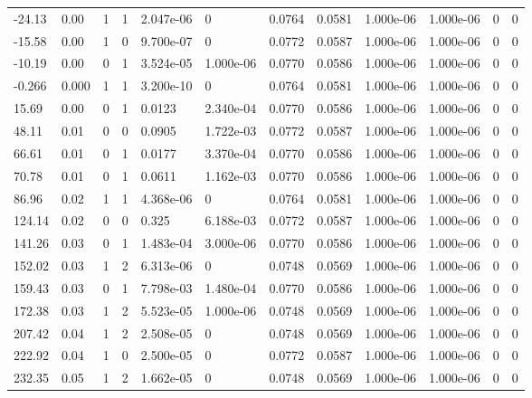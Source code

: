 \documentclass[preview]{standalone}
\begin{document}
{{\begin{tabular}{L{1.2cm}C{1.2cm} C{0.3cm}C{0.5cm} C{1.4cm}C{1.4cm} C{1.4cm}C{1.4cm} C{1.6cm}C{1.6cm} C{1.6cm}C{1.6cm}}
  -24.13  &  0.00  & 1     &  1 &  2.047e-06  & 0  &  0.0764&   0.0581& 1.000e-06 & 1.000e-06   &  0 & 0  \\ 
  -15.58  &  0.00  & 1     &  0 &  9.700e-07  & 0  &  0.0772&   0.0587& 1.000e-06 & 1.000e-06   &  0 & 0  \\ 
  -10.19  &  0.00  & 0     &  1 &  3.524e-05  & 1.000e-06  &  0.0770&   0.0586& 1.000e-06 & 1.000e-06   &  0 & 0  \\ 
  -0.266  &  0.000  & 1     &  1 &  3.200e-10  & 0  &  0.0764&   0.0581& 1.000e-06 & 1.000e-06   &  0 & 0  \\ 
  15.69  &  0.00  & 0     &  1 &  0.0123  & 2.340e-04  &  0.0770&   0.0586& 1.000e-06 & 1.000e-06   &  0 & 0  \\ 
  48.11  &  0.01  & 0     &  0 &  0.0905  & 1.722e-03  &  0.0772&   0.0587& 1.000e-06 & 1.000e-06   &  0 & 0  \\ 
  66.61  &  0.01  & 0     &  1 &  0.0177  & 3.370e-04  &  0.0770&   0.0586& 1.000e-06 & 1.000e-06   &  0 & 0  \\ 
  70.78  &  0.01  & 0     &  1 &  0.0611  & 1.162e-03  &  0.0770&   0.0586& 1.000e-06 & 1.000e-06   &  0 & 0  \\ 
  86.96  &  0.02  & 1     &  1 &  4.368e-06  & 0  &  0.0764&   0.0581& 1.000e-06 & 1.000e-06   &  0 & 0  \\ 
  124.14  &  0.02  & 0     &  0 &  0.325  & 6.188e-03  &  0.0772&   0.0587& 1.000e-06 & 1.000e-06   &  0 & 0  \\ 
  141.26  &  0.03  & 0     &  1 &  1.483e-04  & 3.000e-06  &  0.0770&   0.0586& 1.000e-06 & 1.000e-06   &  0 & 0  \\ 
  152.02  &  0.03  & 1     &  2 &  6.313e-06  & 0  &  0.0748&   0.0569& 1.000e-06 & 1.000e-06   &  0 & 0  \\ 
  159.43  &  0.03  & 0     &  1 &  7.798e-03  & 1.480e-04  &  0.0770&   0.0586& 1.000e-06 & 1.000e-06   &  0 & 0  \\ 
  172.38  &  0.03  & 1     &  2 &  5.523e-05  & 1.000e-06  &  0.0748&   0.0569& 1.000e-06 & 1.000e-06   &  0 & 0  \\ 
  207.42  &  0.04  & 1     &  2 &  2.508e-05  & 0  &  0.0748&   0.0569& 1.000e-06 & 1.000e-06   &  0 & 0  \\ 
  222.92  &  0.04  & 1     &  0 &  2.500e-05  & 0  &  0.0772&   0.0587& 1.000e-06 & 1.000e-06   &  0 & 0  \\ 
  232.35  &  0.05  & 1     &  2 &  1.662e-05  & 0  &  0.0748&   0.0569& 1.000e-06 & 1.000e-06   &  0 & 0  \\ 

\end{tabular}}}
\end{document}
